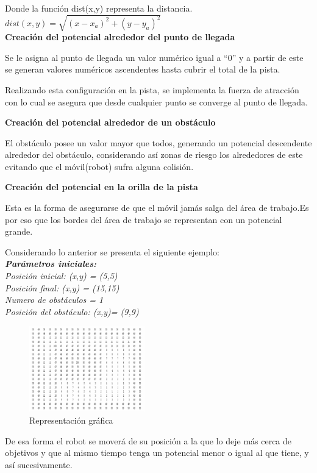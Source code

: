 \documentclass[journal, 10pt]{IEEEtran}
\begin{document}
Donde la función dist(x,y) representa la distancia.\\
$dist(x,y)=\sqrt{(x-x_{a})^{2}+(y-y_{a})^{2}}$\\

\textbf{Creación del potencial alrededor del punto de llegada}

Se le asigna al punto de llegada un valor numérico igual a ``0'' y a partir de este se generan valores numéricos ascendentes hasta cubrir el total de la pista.

Realizando esta configuración en la pista, se implementa la fuerza de atracción con lo cual se asegura que desde cualquier punto se converge al punto de llegada.

\textbf{Creación del potencial alrededor de un obstáculo}

El obstáculo posee un valor mayor que todos, generando un potencial descendente alrededor del obstáculo, considerando así zonas de riesgo los alrededores de este evitando que el móvil(robot) sufra alguna colisión.

\textbf{Creación del potencial en la orilla de la pista}

Esta es la forma de asegurarse de que el móvil jamás salga del área de trabajo.Es por eso que los bordes del área de trabajo se representan con un potencial grande.

Considerando lo anterior se presenta el siguiente ejemplo:\\
\textit{\textbf{Parámetros iniciales:}\\
Posición inicial: (x,y) = (5,5)\\
Posición final: (x,y) = (15,15)\\
Numero de obstáculos = 1\\
Posición del obstáculo: (x,y)= (9,9)}\\

\begin{figure}[H]
    \centering
    \includegraphics[width=5cm]{imag.png}
    \caption{Representación gráfica }
\end{figure}
De esa forma el robot se moverá de su posición a la que lo deje más cerca de objetivos y que al mismo tiempo tenga un potencial menor o igual al que tiene, y así sucesivamente. 
\end{document}
